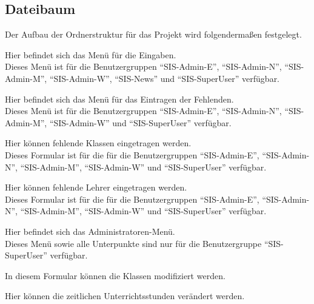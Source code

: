 \subsection{Dateibaum}
Der Aufbau der Ordnerstruktur für das Projekt wird folgendermaßen festgelegt.

\begin{description}[style=nextline]
	\item[/backend/]
		Hier befindet sich das Menü für die Eingaben.\\
		Dieses Menü ist für die Benutzergruppen \enquote{SIS-Admin-E}, \enquote{SIS-Admin-N}, \enquote{SIS-Admin-M}, \enquote{SIS-Admin-W}, \enquote{SIS-News} und \enquote{SIS-SuperUser} verfügbar.
		\begin{description}[style=nextline]
			\item[./absentees/]
				Hier befindet sich das Menü für das Eintragen der Fehlenden.\\
				Dieses Menü ist für die Benutzergruppen \enquote{SIS-Admin-E}, \enquote{SIS-Admin-N}, \enquote{SIS-Admin-M}, \enquote{SIS-Admin-W} und \enquote{SIS-SuperUser} verfügbar.
				\begin{description}[style=nextline]
					\item[./classes/]
						Hier können fehlende Klassen eingetragen werden.\\
						Dieses Formular ist für die für die Benutzergruppen \enquote{SIS-Admin-E}, \enquote{SIS-Admin-N}, \enquote{SIS-Admin-M}, \enquote{SIS-Admin-W} und \enquote{SIS-SuperUser} verfügbar.
					\item[./teachers/]
						Hier können fehlende Lehrer eingetragen werden.\\
						Dieses Formular ist für die für die Benutzergruppen \enquote{SIS-Admin-E}, \enquote{SIS-Admin-N}, \enquote{SIS-Admin-M}, \enquote{SIS-Admin-W} und \enquote{SIS-SuperUser} verfügbar.
				\end{description}
				\item[./administration/]
					Hier befindet sich das Administratoren-Menü.\\
					Dieses Menü sowie alle Unterpunkte sind nur für die Benutzergruppe \enquote{SIS-SuperUser} verfügbar.
					\begin{description}[style=nextline]
						\item[./classes/]
							In diesem Formular können die Klassen modifiziert werden.
						\item[./hours/]
							Hier können die zeitlichen Unterrichtsstunden verändert werden.
						\item[./lessons/]

\end{description}
\end{description}
\end{description}

